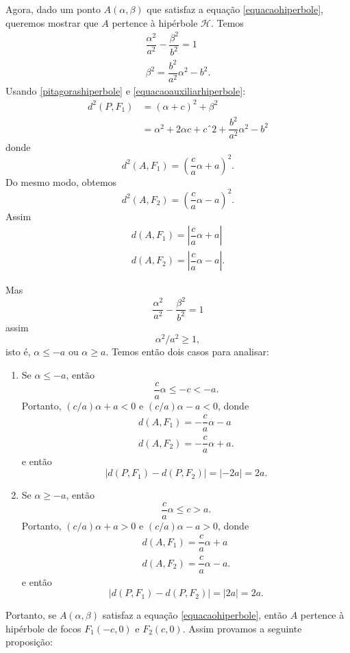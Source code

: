 Agora, dado um ponto $A(\alpha,\beta)$ que satisfaz a equa\c{c}\~ao \eqref{equacaohiperbole}, queremos mostrar que $A$ pertence \`a hip\'erbole $\mathcal{H}$. Temos
\begin{align}
  \dfrac{\alpha^2}{a^2} - \dfrac{\beta^2}{b^2} = 1\nonumber\\
  \beta^2 = \dfrac{b^2}{a^2}\alpha^2 - b^2.\label{equacaoauxiliarhiperbole}
\end{align}
Usando \eqref{pitagorashiperbole} e \eqref{equacaoauxiliarhiperbole}:
\begin{align*}
  d^2(P,F_1) &= (\alpha + c)^2 + \beta^2\\
  &= \alpha^2 + 2\alpha c + cˆ2 + \dfrac{b^2}{a^2}\alpha^2 - b^2
\end{align*}
donde
\[
  d^2(A,F_1) = \left(\dfrac{c}{a}\alpha + a\right)^2.
\]
Do mesmo modo, obtemos
\[
  d^2(A,F_2) = \left(\dfrac{c}{a}\alpha - a\right)^2.
\]
Assim
\begin{align}
  d(A,F_1) = \left|\dfrac{c}{a}\alpha + a\right|\\
  d(A,F_2) = \left|\dfrac{c}{a}\alpha - a\right|.
\end{align}

Mas
\[
  \dfrac{\alpha^2}{a^2} - \dfrac{\beta^2}{b^2} = 1
\]
assim 
\begin{equation}\label{pontohiperbole}
  \alpha^2/a^2 \ge 1,
\end{equation}
isto \'e, $\alpha \le -a$ ou $\alpha \ge a$. Temos ent\~ao dois casos para analisar:
\begin{enumerate}
  \item Se $\alpha \le -a$, ent\~ao
  \[
    \dfrac{c}{a}\alpha \le -c < -a.
  \]
  Portanto, $(c/a)\alpha + a < 0$ e $(c/a)\alpha - a < 0$, donde
  \begin{align*}
  d(A,F_1) = -\dfrac{c}{a}\alpha - a\\
  d(A,F_2) = -\dfrac{c}{a}\alpha + a.
\end{align*}
e ent\~ao
\[
  | d(P,F_1) - d(P,F_2)| = |-2a| = 2a.
\]
\item Se $\alpha \ge -a$, ent\~ao
  \[
    \dfrac{c}{a}\alpha \le c > a.
  \]
  Portanto, $(c/a)\alpha + a > 0$ e $(c/a)\alpha - a > 0$, donde
  \begin{align*}
  d(A,F_1) = \dfrac{c}{a}\alpha + a\\
  d(A,F_2) = \dfrac{c}{a}\alpha - a.
\end{align*}
e ent\~ao
\[
  | d(P,F_1) - d(P,F_2)| = |2a| = 2a.
\]
\end{enumerate}
Portanto, se $A(\alpha,\beta)$ satisfaz a equa\c{c}\~ao \eqref{equacaohiperbole}, ent\~ao $A$ pertence \`a hip\'erbole de focos $F_1(-c,0)$ e $F_2(c,0)$. Assim provamos a seguinte proposi\c{c}\~ao:

